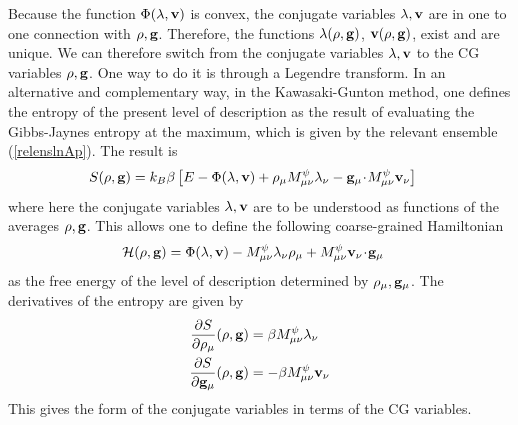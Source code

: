 \documentclass[b5paper,openright,11pt]{book}
\newcommand{\esc}{\!\cdot\!}
\newcommand{\Pendiente}[1]{{\color{green}#1}} %
\begin{document}
\begin{appendices}
Because the function $ \Phi(\lambda,{\bf v})$ is convex, the conjugate
variables  $\lambda,{\bf  v}$  are  in  one  to  one  connection  with
$\rho,{\bf  g}$.  Therefore,  the  functions $\lambda(\rho,{\bf  g})$,
${\bf  v}(\rho,{\bf g})$,  exist  and are  unique.   We can  therefore
switch  from  the conjugate  variables  $\lambda,{\bf  v}$ to  the  CG
variables $\rho,{\bf  g}$.  One  way to  do it  is through  a Legendre
transform.   In   an  alternative   and  complementary  way,   in  the
Kawasaki-Gunton method, one  defines the entropy of  the present level
of description  as the result  of evaluating the  Gibbs-Jaynes entropy
at  the maximum, which  is given by  the relevant
ensemble (\ref{relenslnAp}).  The result is
\Pendiente{
\begin{align}
  S(\rho,{\bf g}) &=k_B\beta\left[E-\Phi(\lambda,{\bf v})
+\rho_\mu M^\psi_{\mu\nu}\lambda_\nu-{\bf g}_\mu\esc M^\psi_{\mu\nu}{\bf v}_\nu\right]
\label{entropy2}
\end{align}
}
where  here  the  conjugate  variables $\lambda,{\bf  v}$  are  to  be
understood as functions  of the averages $\rho,{\bf  g}$.  This allows one
to define  the following coarse-grained Hamiltonian
\begin{align}
  {\cal H}(\rho,{\bf g}) &=\Phi(\lambda,{\bf v})
 - M^\psi_{\mu\nu}\lambda_\nu \rho_\mu+M^\psi_{\mu\nu}{\bf v}_\nu\esc {\bf g}_\mu
\label{olegApp}
\end{align}
as  the  free  energy  of  the  level  of  description  determined  by
$\rho_\mu,{\bf g}_\mu$. The derivatives of the entropy are given by
\begin{align}
\frac{\partial S}{\partial \rho_\mu} (\rho,{\bf g}) &=\beta M^\psi_{\mu\nu}\lambda_\nu
\nonumber\\
\frac{\partial S}{\partial {\bf g}_\mu} (\rho,{\bf g}) &=- \beta M^\psi_{\mu\nu}{\bf v}_\nu
\label{derS}
\end{align}
This gives the form of the conjugate variables in terms of the CG variables.

\end{appendices}
\end{document}

